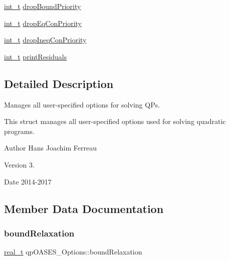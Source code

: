 \begin{DoxyCompactItemize}
\item 
\hyperlink{_types_8hpp_ab6fd6105e64ed14a0c9281326f05e623}{int\+\_\+t} \hyperlink{structqp_o_a_s_e_s___options_aa7fbe2d8d1e7a224e5e56120da09c17b}{drop\+Bound\+Priority}
\item 
\hyperlink{_types_8hpp_ab6fd6105e64ed14a0c9281326f05e623}{int\+\_\+t} \hyperlink{structqp_o_a_s_e_s___options_aef2d6f1515675a21d7b1f8849d44d303}{drop\+Eq\+Con\+Priority}
\item 
\hyperlink{_types_8hpp_ab6fd6105e64ed14a0c9281326f05e623}{int\+\_\+t} \hyperlink{structqp_o_a_s_e_s___options_adb23eb5d0193c5a7e2668205072e4c02}{drop\+Ineq\+Con\+Priority}
\item 
\hyperlink{_types_8hpp_ab6fd6105e64ed14a0c9281326f05e623}{int\+\_\+t} \hyperlink{structqp_o_a_s_e_s___options_ad6ffb2216fbd2078b676a1b6aeeeabb1}{print\+Residuals}
\end{DoxyCompactItemize}


\subsection{Detailed Description}
Manages all user-\/specified options for solving Q\+Ps. 

This struct manages all user-\/specified options used for solving quadratic programs.

\begin{DoxyAuthor}{Author}
Hans Joachim Ferreau 
\end{DoxyAuthor}
\begin{DoxyVersion}{Version}
3. 
\end{DoxyVersion}
\begin{DoxyDate}{Date}
2014-\/2017 
\end{DoxyDate}


\subsection{Member Data Documentation}
\mbox{\label{structqp_o_a_s_e_s___options_a9b1d54029ca9e1668eca3781989ed250}} 
\subsubsection{\texorpdfstring{bound\+Relaxation}{boundRelaxation}}
{\footnotesize\ttfamily \hyperlink{qp_o_a_s_e_s__wrapper_8h_a0d00e2b3dfadee81331bbb39068570c4}{real\+\_\+t} qp\+O\+A\+S\+E\+S\+\_\+\+Options\+::bound\+Relaxation}

